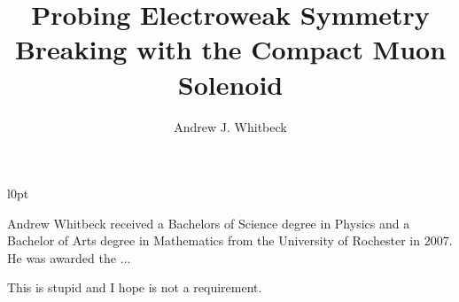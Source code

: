 \documentclass[12pt,oneside,final]{thesis}
\begin{document}
\title{Probing Electroweak Symmetry Breaking with the Compact Muon Solenoid}
\author{Andrew J. Whitbeck}
\dissertation
\doctorphilosophy
\copyrightnotice

















\begin{vita}

\begin{wrapfigure}{l}{0pt}
\end{wrapfigure}

Andrew Whitbeck received a Bachelors of Science degree in Physics and 
a Bachelor of Arts degree in Mathematics from the University of Rochester 
in 2007.  He was awarded the ...

This is stupid and I hope is not a requirement.

\end{vita}
\end{document}
